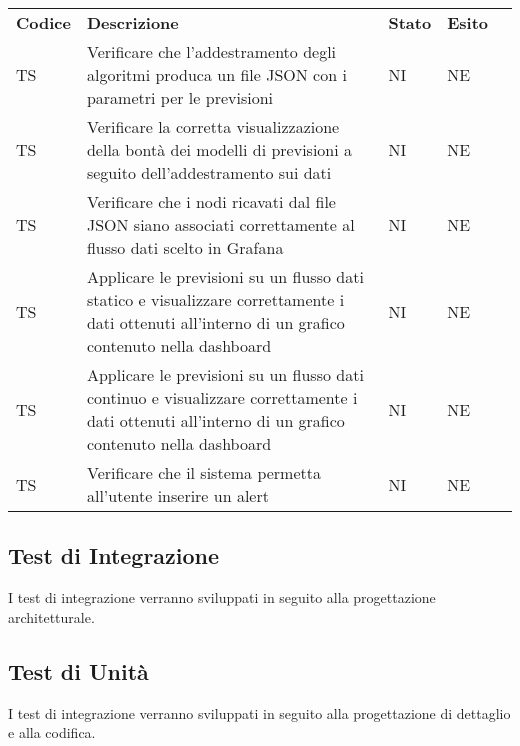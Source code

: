 \begin{longtable} {
		>{\centering}p{15mm} 
		>{\centering}p{79.5mm}
		>{\centering}p{15mm} 
		>{\centering}p{15mm}
		>{}p{0mm}}
	\rowcolor{gray!50}
	\textbf{Codice} & \textbf{Descrizione} & \textbf{Stato} & \textbf{Esito} &\TBstrut \\
	TS & Verificare che l'addestramento degli algoritmi produca un file JSON con i parametri per le previsioni & NI & NE  &\TBstrut \\ [2mm]
	TS & Verificare la corretta visualizzazione della bontà dei modelli di previsioni a seguito dell'addestramento sui dati & NI & NE  &\TBstrut \\ [2mm]
	TS & Verificare che i nodi ricavati dal file JSON siano associati correttamente al flusso dati scelto in Grafana\glo & NI & NE  &\TBstrut \\ [2mm]
	TS & Applicare le previsioni su un flusso dati statico e visualizzare correttamente i dati ottenuti all'interno di un grafico contenuto nella dashboard\glo & NI & NE  &\TBstrut \\ [2mm]
	TS & Applicare le previsioni su un flusso dati continuo e visualizzare correttamente i dati ottenuti all'interno di un grafico contenuto nella dashboard\glo & NI & NE  &\TBstrut \\ [2mm]
	TS & Verificare che il sistema permetta all'utente inserire un alert\glo & NI & NE  &\TBstrut \\ [2mm]
	
\end{longtable}


\subsection{Test di Integrazione}
I test di integrazione verranno sviluppati in seguito alla progettazione architetturale.

\subsection{Test di Unità}
I test di integrazione verranno sviluppati in seguito alla progettazione di dettaglio e alla codifica.

